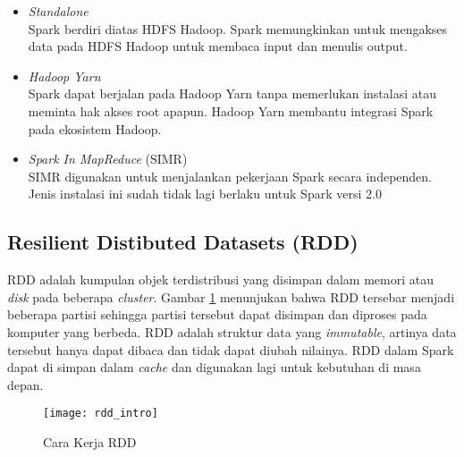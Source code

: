 \begin{itemize}
\item \textit{Standalone}\\  
Spark berdiri diatas HDFS Hadoop. Spark memungkinkan untuk mengakses data pada HDFS Hadoop untuk membaca input dan menulis output.

\item \textit{Hadoop Yarn}\\
Spark dapat berjalan pada Hadoop Yarn tanpa memerlukan instalasi atau meminta hak akses root apapun. Hadoop Yarn membantu integrasi Spark pada ekosistem Hadoop.

\item \textit{Spark In MapReduce} (SIMR)\\ 
SIMR digunakan untuk menjalankan pekerjaan Spark secara independen. Jenis instalasi ini sudah tidak lagi berlaku untuk Spark versi 2.0
\end{itemize}

\subsection{Resilient Distibuted Datasets (RDD)}
\label{sec:rdd}
\par RDD adalah kumpulan objek terdistribusi yang disimpan dalam memori atau \textit{disk} pada beberapa \textit{cluster}. Gambar \ref{fig:rdd_intro} menunjukan bahwa RDD tersebar menjadi beberapa partisi sehingga partisi tersebut dapat disimpan dan diproses pada komputer yang berbeda. RDD adalah struktur data yang \textit{immutable}, artinya data tersebut hanya dapat dibaca dan tidak dapat diubah nilainya. RDD dalam Spark dapat di simpan dalam \textit{cache} dan digunakan lagi untuk kebutuhan di masa depan. 

\begin{figure}[H]
	\centering
	\texttt{[image: rdd\_intro]}
	\caption{Cara Kerja RDD}
	\label{fig:rdd_intro}
\end{figure}


